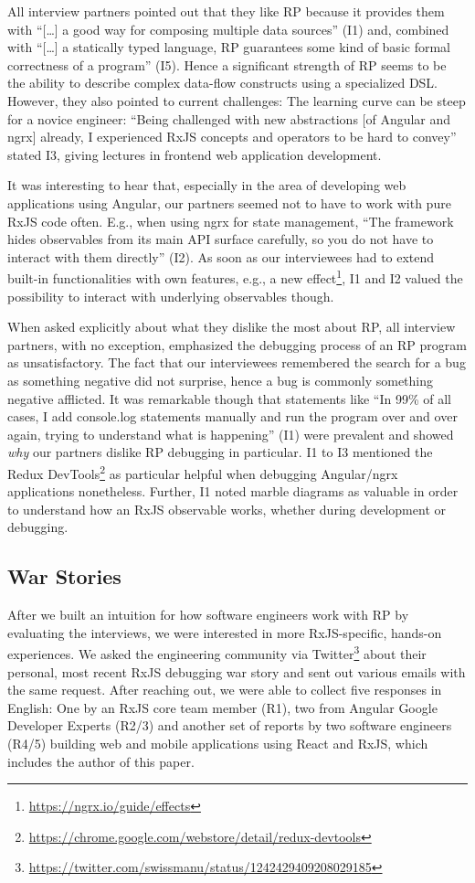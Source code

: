 \documentclass[sigplan,screen,review]{acmart}
\begin{document}
All interview partners pointed out that they like RP because it provides them with ``[\dots] a good way for composing multiple data sources'' (I1) and, combined with ``[\dots] a statically typed language, RP guarantees some kind of basic formal correctness of a program'' (I5). Hence a significant strength of RP seems to be the ability to describe complex data-flow constructs using a specialized DSL. However, they also pointed to current challenges: The learning curve can be steep for a novice engineer: ``Being challenged with new abstractions [of Angular and ngrx] already, I experienced RxJS concepts and operators to be hard to convey'' stated I3, giving lectures in frontend web application development.

It was interesting to hear that, especially in the area of developing web applications using Angular, our partners seemed not to have to work with pure RxJS code often. E.g., when using ngrx for state management, ``The framework hides observables from its main API surface carefully, so you do not have to interact with them directly'' (I2). As soon as our interviewees had to extend built-in functionalities with own features, e.g., a new effect\footnote{\url{https://ngrx.io/guide/effects}}, I1 and I2 valued the possibility to interact with underlying observables though.

When asked explicitly about what they dislike the most about RP, all interview partners, with no exception, emphasized the debugging process of an RP program as unsatisfactory. The fact that our interviewees remembered the search for a bug as something negative did not surprise, hence a bug is commonly something negative afflicted. It was remarkable though that statements like ``In 99\% of all cases, I add console.log statements manually and run the program over and over again, trying to understand what is happening'' (I1) were prevalent and showed \emph{why} our partners dislike RP debugging in particular. I1 to I3 mentioned the Redux DevTools\footnote{\url{https://chrome.google.com/webstore/detail/redux-devtools}} as particular helpful when debugging Angular/ngrx applications nonetheless. Further, I1 noted marble diagrams as valuable in order to understand how an RxJS observable works, whether during development or debugging.

\subsection{War Stories}

After we built an intuition for how software engineers work with RP by evaluating the interviews, we were interested in more RxJS-specific, hands-on experiences. We asked the engineering community via Twitter\footnote{\url{https://twitter.com/swissmanu/status/1242429409208029185}} about their personal, most recent RxJS debugging war story and sent out various emails with the same request. After reaching out, we were able to collect five responses in English: One by an RxJS core team member (R1), two from Angular Google Developer Experts (R2/3) and another set of reports by two software engineers (R4/5) building web and mobile applications using React and RxJS, which includes the author of this paper.
\end{document}
